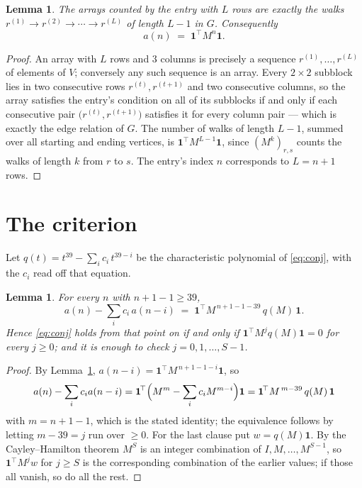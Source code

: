 \documentclass[11pt,a4paper]{article}
\theoremstyle{plain}
\newtheorem{lemma}[theorem]{Lemma}
\theoremstyle{definition}
\begin{document}
\begin{lemma}\label{lem:walk}
The arrays counted by the entry with $L$ rows are exactly the walks
$r^{(1)}\to r^{(2)}\to\cdots\to r^{(L)}$ of length $L-1$ in $G$. Consequently
\[
a(n)\;=\;\mathbf{1}^{\!\top}M^{n}\mathbf{1} .
\]
\end{lemma}

\begin{proof}
An array with $L$ rows and $3$ columns is precisely a sequence
$r^{(1)},\dots,r^{(L)}$ of elements of $V$; conversely any such sequence is an array.
Every $2\times2$ subblock lies in two consecutive rows $r^{(t)},r^{(t+1)}$ and two
consecutive columns, so the array satisfies the entry's condition on all of its subblocks
if and only if each consecutive pair $\bigl(r^{(t)},r^{(t+1)}\bigr)$ satisfies it for
every column pair --- which is exactly the edge relation of $G$. The number of walks of
length $L-1$, summed over all starting and ending vertices, is
$\mathbf{1}^{\!\top}M^{L-1}\mathbf{1}$, since $(M^{k})_{r,s}$ counts the walks of
length $k$ from $r$ to $s$. The entry's index $n$ corresponds to $L=n+1$ rows.
\end{proof}

\section{The criterion}

Let $q(t)=t^{39}-\sum_i c_i\,t^{39-i}$ be the characteristic polynomial of
\eqref{eq:conj}, with the $c_i$ read off that equation.

\begin{lemma}\label{lem:crit}
For every $n$ with $n+1-1\ge39$,
\[
a(n)-\sum_i c_i\,a(n-i)\;=\;\mathbf{1}^{\!\top}M^{\,n+1-1-39}\,q(M)\,\mathbf{1} .
\]
Hence \eqref{eq:conj} holds from that point on if and only if
$\mathbf{1}^{\!\top}M^{j}q(M)\mathbf{1}=0$ for every $j\ge0$; and it is enough to check
$j=0,1,\dots,S-1$.
\end{lemma}

\begin{proof}
By Lemma~\ref{lem:walk}, $a(n-i)=\mathbf{1}^{\!\top}M^{\,n+1-1-i}\mathbf{1}$, so
\[
a(n)-\sum_i c_i a(n-i)
=\mathbf{1}^{\!\top}\Bigl(M^{m}-\sum_i c_i M^{m-i}\Bigr)\mathbf{1}
=\mathbf{1}^{\!\top}M^{\,m-39}\,q(M)\,\mathbf{1}
\]
with $m=n+1-1$, which is the stated identity; the equivalence follows by letting
$m-39=j$ run over $\ge0$. For the last clause put $w=q(M)\mathbf{1}$. By the
Cayley--Hamilton theorem $M^{S}$ is an integer combination of $I,M,\dots,M^{S-1}$, so
$\mathbf{1}^{\!\top}M^{j}w$ for $j\ge S$ is the corresponding combination of the earlier
values; if those all vanish, so do all the rest.
\end{proof}
\end{document}
